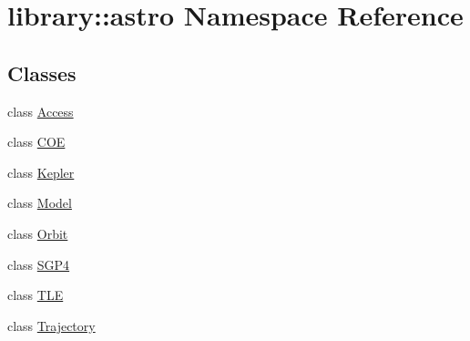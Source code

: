 \hypertarget{namespacelibrary_1_1astro}{}\section{library\+:\+:astro Namespace Reference}
\label{namespacelibrary_1_1astro}
\subsection*{Classes}
\begin{DoxyCompactItemize}
\item 
class \hyperlink{classlibrary_1_1astro_1_1_access}{Access}
\item 
class \hyperlink{classlibrary_1_1astro_1_1_c_o_e}{C\+OE}
\item 
class \hyperlink{classlibrary_1_1astro_1_1_kepler}{Kepler}
\item 
class \hyperlink{classlibrary_1_1astro_1_1_model}{Model}
\item 
class \hyperlink{classlibrary_1_1astro_1_1_orbit}{Orbit}
\item 
class \hyperlink{classlibrary_1_1astro_1_1_s_g_p4}{S\+G\+P4}
\item 
class \hyperlink{classlibrary_1_1astro_1_1_t_l_e}{T\+LE}
\item 
class \hyperlink{classlibrary_1_1astro_1_1_trajectory}{Trajectory}
\end{DoxyCompactItemize}
